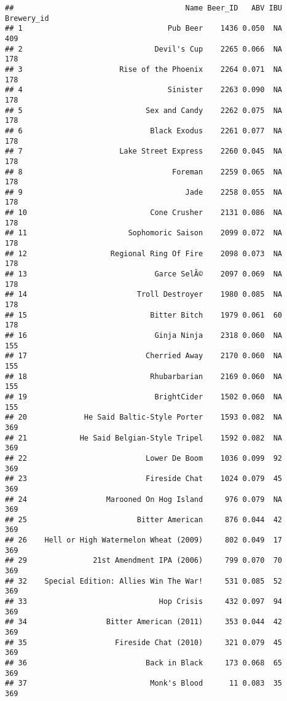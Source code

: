 \documentclass[
]{article}
\begin{document}
\begin{verbatim}
##                                       Name Beer_ID   ABV IBU Brewery_id
## 1                                 Pub Beer    1436 0.050  NA        409
## 2                              Devil's Cup    2265 0.066  NA        178
## 3                      Rise of the Phoenix    2264 0.071  NA        178
## 4                                 Sinister    2263 0.090  NA        178
## 5                            Sex and Candy    2262 0.075  NA        178
## 6                             Black Exodus    2261 0.077  NA        178
## 7                      Lake Street Express    2260 0.045  NA        178
## 8                                  Foreman    2259 0.065  NA        178
## 9                                     Jade    2258 0.055  NA        178
## 10                            Cone Crusher    2131 0.086  NA        178
## 11                       Sophomoric Saison    2099 0.072  NA        178
## 12                   Regional Ring Of Fire    2098 0.073  NA        178
## 13                             Garce SelÃ©    2097 0.069  NA        178
## 14                         Troll Destroyer    1980 0.085  NA        178
## 15                            Bitter Bitch    1979 0.061  60        178
## 16                             Ginja Ninja    2318 0.060  NA        155
## 17                           Cherried Away    2170 0.060  NA        155
## 18                            Rhubarbarian    2169 0.060  NA        155
## 19                             BrightCider    1502 0.060  NA        155
## 20             He Said Baltic-Style Porter    1593 0.082  NA        369
## 21            He Said Belgian-Style Tripel    1592 0.082  NA        369
## 22                           Lower De Boom    1036 0.099  92        369
## 23                           Fireside Chat    1024 0.079  45        369
## 24                  Marooned On Hog Island     976 0.079  NA        369
## 25                         Bitter American     876 0.044  42        369
## 26    Hell or High Watermelon Wheat (2009)     802 0.049  17        369
## 29               21st Amendment IPA (2006)     799 0.070  70        369
## 32    Special Edition: Allies Win The War!     531 0.085  52        369
## 33                              Hop Crisis     432 0.097  94        369
## 34                  Bitter American (2011)     353 0.044  42        369
## 35                    Fireside Chat (2010)     321 0.079  45        369
## 36                           Back in Black     173 0.068  65        369
## 37                            Monk's Blood      11 0.083  35        369

\end{verbatim}
\end{document}
